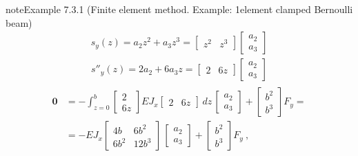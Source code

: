 \documentclass[letterpaper,10pt,english]{jupyterBook}
\begin{document}
\begin{sphinxadmonition}{note}{Example 7.3.1 (Finite element method. Example: 1\sphinxhyphen{}element clamped Bernoulli beam)}
\sphinxAtStartPar
{}
\begin{equation*}
\begin{split}s_y(z) = a_2 z^2 + a_3 z^3 = \begin{bmatrix} z^2 & z^3 \end{bmatrix} \begin{bmatrix} a_2 \\ a_3 \end{bmatrix}\end{split}
\end{equation*}\begin{equation*}
\begin{split}s''_y(z) = 2 a_2 + 6 a_3 z = \begin{bmatrix} 2   & 6 z \end{bmatrix} \begin{bmatrix} a_2 \\ a_3 \end{bmatrix}\end{split}
\end{equation*}\begin{equation*}
\begin{split}\begin{aligned}
\mathbf{0} 
  & = - \int_{z=0}^{b} \begin{bmatrix} 2 \\ 6 z \end{bmatrix} EJ_x  \begin{bmatrix} 2 & 6 z \end{bmatrix} \, dz \, \begin{bmatrix} a_2 \\ a_3 \end{bmatrix} + \begin{bmatrix} b^2 \\ b^3 \end{bmatrix} F_y = \\
  & = - EJ_x \begin{bmatrix} 4 b & 6 b^2 \\ 6 b^2 & 12 b^3 \end{bmatrix} \, \begin{bmatrix} a_2 \\ a_3 \end{bmatrix} + \begin{bmatrix} b^2 \\ b^3 \end{bmatrix} F_y \ ,
\end{aligned}\end{split}

\end{equation*}
\end{sphinxadmonition}
\end{document}
